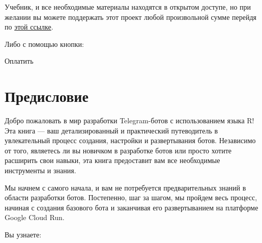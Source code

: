 \documentclass[
]{book}
\begin{document}
Учебник, и все необходимые материалы находятся в открытом доступе, но при желании вы можете поддержать этот проект любой произвольной сумме перейдя по \href{https://secure.wayforpay.com/payment/build_telegram_bot_using_r}{этой ссылке}.

Либо с помощью кнопки:

{Оплатить}

\chapter*{Предисловие}\label{ux43fux440ux435ux434ux438ux441ux43bux43eux432ux438ux435}

Добро пожаловать в мир разработки Telegram-ботов с использованием языка R! Эта книга --- ваш детализированный и практический путеводитель в увлекательный процесс создания, настройки и развертывания ботов. Независимо от того, являетесь ли вы новичком в разработке ботов или просто хотите расширить свои навыки, эта книга предоставит вам все необходимые инструменты и знания.

Мы начнем с самого начала, и вам не потребуется предварительных знаний в области разработки ботов. Постепенно, шаг за шагом, мы пройдем весь процесс, начиная с создания базового бота и заканчивая его развертыванием на платформе Google Cloud Run.

Вы узнаете:
\end{document}
